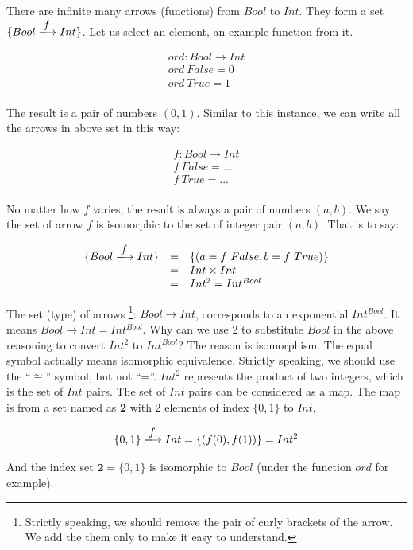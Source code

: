 \documentclass[b5paper]{article}
\begin{document}
\begin{example}
\normalfont
There are infinite many arrows (functions) from $Bool$ to $Int$. They form a set $\{Bool \arrowto{f} Int\}$. Let us select an element, an example function from it.

\[
\begin{array}{l}
ord : Bool \to Int \\
ord\ False = 0 \\
ord\ True = 1 \\
\end{array}
\]

The result is a pair of numbers $(0, 1)$. Similar to this instance, we can write all the arrows in above set in this way:

\[
\begin{array}{l}
f : Bool \to Int \\
f\ False = ... \\
f\ True = ... \\
\end{array}
\]

No matter how $f$ varies, the result is always a pair of numbers $(a, b)$. We say the set of arrow $f$ is isomorphic to the set of integer pair $(a, b)$. That is to say:

\[
\begin{array}{rcl}
\{Bool \arrowto{f} Int\} & = & \{(a = f\ False, b = f\ True)\} \\
  & = & Int \times Int \\
  & = & Int^2 = Int^{Bool}
\end{array}
\]

The set (type) of arrows \footnote{Strictly speaking, we should remove the pair of curly brackets of the arrow. We add the them only to make it easy to understand.}: $Bool \to Int$, corresponds to an exponential $Int^{Bool}$. It means $Bool \to Int = Int^{Bool}$. Why can we use 2 to substitute $Bool$ in the above reasoning to convert $Int^2$ to $Int^{Bool}$? The reason is isomorphism. The equal symbol actually means isomorphic equivalence. Strictly speaking, we should use the ``$\cong$'' symbol, but not ``=''. $Int^2$ represents the product of two integers, which is the set of $Int$ pairs. The set of $Int$ pairs can be considered as a map. The map is from a set named as \textbf{2} with 2 elements of index $\{0, 1\}$ to $Int$.

\[
\{0, 1\} \arrowto{f} Int = \{(f(0), f(1))\} = Int^2
\]

And the index set $\mathbf{2} = \{0, 1\}$ is isomorphic to $Bool$ (under the function $ord$ for example).
\end{example}
\end{document}
